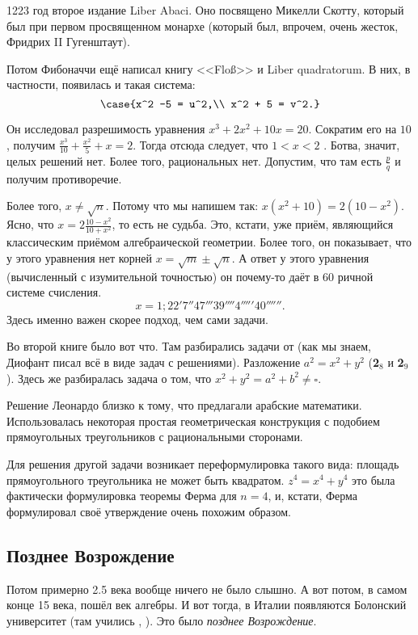 \documentclass[a4paper,oneside,fleqn,10pt]{article}
\begin{document}
1223 год второе издание Liber Abaci. Оно посвящено Микелли Скотту,
который был при первом просвященном монархе (который был, впрочем, очень
жесток, Фридрих II Гугенштаут).

Потом Фибоначчи ещё написал книгу <<Flo\ss>> и Liber quadratorum.
В них, в частности, появилась и такая система:
$$\case{x^2 -5 = u^2,\\
x^2 + 5 = v^2.}$$

Он исследовал разрешимость уравнения $x^3 + 2x^2 + 10x = 20$.
Сократим его на $10$, получим $\frac{x^3}{10} + \frac{x^2}{5} + x = 2$.
Тогда отсюда следует, что $1 < x < 2$ . Ботва, значит, целых решений нет.
Более того, рациональных нет. Допустим, что там есть $\frac{p}{q}$ и получим противоречие.

Более того, $x \ne \sqrt n$. Потому что мы напишем так: $x(x^2 + 10) = 2(10-x^2)$.
Ясно, что $x = 2 \frac{10-x^2}{10+x^2}$, то есть не судьба.
Это, кстати, уже приём, являющийся классическим приёмом алгебраической геометрии.
Более того, он показывает, что у этого уравнения нет корней $x = \sqrt m \pm \sqrt n$.
А ответ у этого уравнения (вычисленный с изумительной точностью) он почему-то даёт в $60$ ричной системе счисления.
$$x = 1;22'7''47'''39''''4'''''40''''''.$$
Здесь именно важен скорее подход, чем сами задачи.

Во второй книге было вот что. Там разбирались задачи от  (как мы знаем, Диофант
писал всё в виде задач с решениями).
Разложение $a^2 = x^2 + y^2$ (\textbf{2}$_8$ и \textbf{2}$_9$).
Здесь же разбиралась задача о том, что $x^2 + y^2 = a^2 + b^2 \ne \square$.

Решение Леонардо близко к тому, что предлагали арабские математики.
Использовалась некоторая простая геометрическая конструкция с подобием
прямоугольных треугольников с рациональными сторонами.

Для решения другой задачи возникает переформулировка такого вида: площадь прямоугольного
треугольника не может быть квадратом. $z^4 = x^4 + y^4$ это была фактически
формулировка теоремы Ферма для $n=4$, и, кстати, Ферма формулировал своё утверждение
очень похожим образом.

\subsection{Позднее Возрождение}

Потом примерно 2.5 века вообще ничего не было слышно. А вот потом, в самом конце 15 века,
пошёл век алгебры. И вот тогда, в Италии появляются Болонский университет (там учились
, ).
Это было \emph{позднее Возрождение}.
\end{document}
